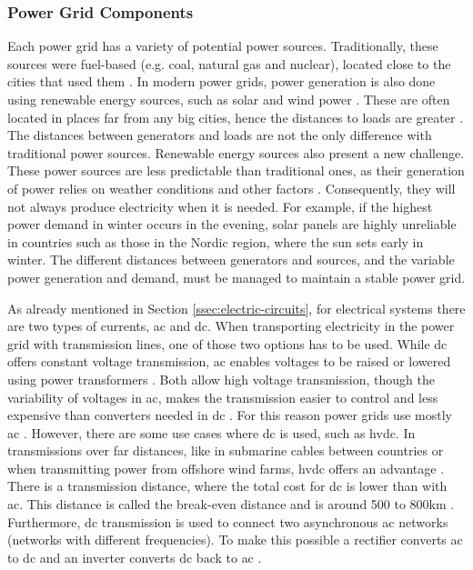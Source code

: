 \subsubsection{Power Grid Components}
Each power grid has a variety of potential power sources. Traditionally, these sources were fuel-based (e.g. coal, natural gas and nuclear), located close to the cities that used them \cite{rl4network_operation}.
In modern power grids, power generation is also done using renewable energy sources, such as solar and wind power \cite{rl4network_operation}. These are often located in places far from any big cities, hence the distances to loads are greater \cite{RoleOfGridExtensionsEurope}. 
The distances between generators and loads are not the only difference with traditional power sources. Renewable energy sources also present a new challenge. 
These power sources are less predictable than traditional ones, as their generation of power relies on weather conditions and other factors \cite{challenges_integrating_var_renewables}. 
Consequently, they will not always produce electricity when it is needed. For example, if the highest power demand in winter occurs in the evening, solar panels are highly unreliable in countries such as those in the Nordic region, where the sun sets early in winter.
The different distances between generators and sources, and the variable power generation and demand, must be managed to maintain a stable power grid.

As already mentioned in Section \ref{ssec:electric-circuits}, for electrical systems there are two types of currents, \ac{ac} and \ac{dc}. When transporting electricity in the power grid with transmission lines, one of those two options has to be used. While \ac{dc} offers constant voltage transmission, \ac{ac} enables voltages to be raised or lowered using power transformers \cite{rl4network_operation}. Both allow high voltage transmission, though the variability of voltages in \ac{ac}, makes the transmission easier to control and less expensive than converters needed in \ac{dc} \cite{hvdcReviewIEEE}. For this reason power grids use mostly \ac{ac} \cite{rl4network_operation}. However, there are some use cases where \ac{dc} is used, such as \ac{hvdc}. In transmissions over far distances, like in submarine cables between countries or when transmitting power from offshore wind farms, \ac{hvdc} offers an advantage \cite{hvdcReviewEnergyWeek}. There is a transmission distance, where the total cost for \ac{dc} is lower than with \ac{ac}. This distance is called the break-even distance and is around 500 to 800km \cite{hvdcReviewIEEE}.
Furthermore, \ac{dc} transmission is used to connect two asynchronous \ac{ac} networks (networks with different frequencies). To make this possible a rectifier converts \ac{ac} to \ac{dc} and an inverter converts \ac{dc} back to \ac{ac} \cite{hvdcReviewEnergyWeek}.

